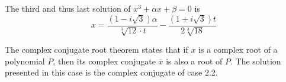 The third and thus last solution of $x^3 + \alpha x + \beta = 0$ is
\[x = \frac{(1-i \sqrt{3}) \alpha}{\sqrt[3]{12} \cdot t}
     -\frac{(1+i\sqrt{3}) t}{2\sqrt[3]{18}}\]

The complex conjugate root theorem states
that if $x$ is a complex root of a polynomial $P$, then its
complex conjugate $\overline{x}$ is also a root of $P$.
The solution presented in this case is the complex conjugate of
case 2.2.
